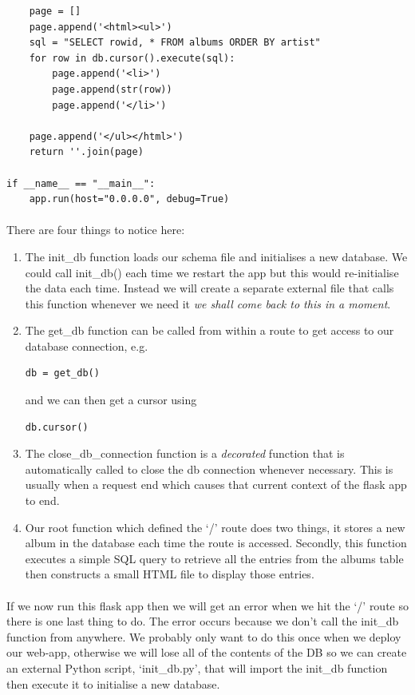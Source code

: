 \documentclass[12pt, a4paper, oneside]{book}
\begin{document}
{\begin{lstlisting}
    page = []
    page.append('<html><ul>')
    sql = "SELECT rowid, * FROM albums ORDER BY artist"
    for row in db.cursor().execute(sql):
        page.append('<li>')
        page.append(str(row))
        page.append('</li>')

    page.append('</ul></html>')
    return ''.join(page)

if __name__ == "__main__":
    app.run(host="0.0.0.0", debug=True)
\end{lstlisting}

\paragraph{} There are four things to notice here:

\begin{enumerate}
\item The init\_db function loads our schema file and initialises a new database. We could call init\_db() each time we restart the app but this would re-initialise the data each time. Instead we will create a separate external file that calls this function whenever we need it \emph{we shall come back to this in a moment}.
\item The get\_db function can be called from within a route to get access to our database connection, e.g.
\begin{lstlisting}[style=DOS]
db = get_db()
\end{lstlisting}
and we can then get a cursor using
\begin{lstlisting}[style=DOS]
db.cursor()
\end{lstlisting}
\item The close\_db\_connection function is a \emph{decorated} function that is automatically called to close the db connection whenever necessary. This is usually when a request end which causes that current context of the flask app to end.
\item Our root function which defined the `/' route does two things, it stores a new album in the database each time the route is accessed. Secondly, this function executes a simple SQL query to retrieve all the entries from the albums table then constructs a small HTML file to display those entries. 
\end{enumerate}

\paragraph{} If we now run this flask app then we will get an error when we hit the `/' route so there is one last thing to do. The error occurs because we don't call the init\_db function from anywhere. We probably only want to do this once when we deploy our web-app, otherwise we will lose all of the contents of the DB so we can create an external Python script, `init\_db.py', that will import the init\_db function then execute it to initialise a new database.

}
\end{document}
